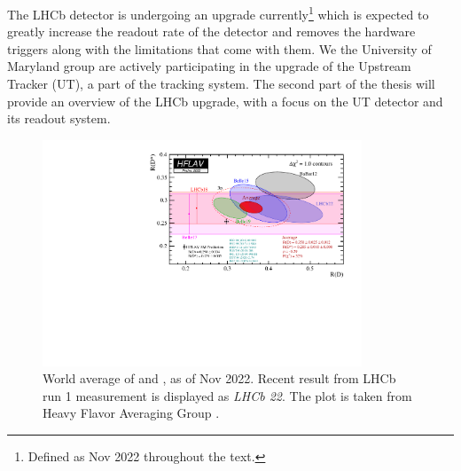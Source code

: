 The LHCb detector is undergoing an upgrade currently\footnote{
    Defined as Nov 2022 throughout the text.
} which is expected to greatly increase
the readout rate of the detector and removes the hardware triggers along
with the limitations that come with them.
We the University of Maryland group are actively participating in the upgrade
of the Upstream Tracker (UT), a part of the tracking system.
The second part of the thesis will provide an overview of the LHCb upgrade, with
a focus on the UT detector and its readout system.

\begin{figure}[!htb]
    \centering
    \includegraphics[width=0.85\textwidth]{./figs-intro/hflav_2022_preliminary.pdf}
    \caption{
        World average of \RD and \RDst, as of Nov 2022.
        Recent result from LHCb run 1 measurement is displayed as
        \emph{LHCb 22}.
        The plot is taken from Heavy Flavor Averaging Group
        \cite{Amhis:2022mac}.
    }
    \label{fig:hflav}
\end{figure}

